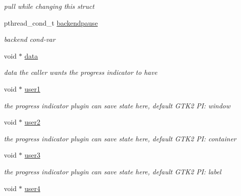 \begin{CompactItemize}
\begin{CompactList}\small\item\em pull while changing this struct \item\end{CompactList}\item 
\hypertarget{struct__noir__job_o24}{
pthread\_\-cond\_\-t \hyperlink{struct__noir__job_o24}{backendpause}}
\label{struct__noir__job_o24}

\begin{CompactList}\small\item\em backend cond-var \item\end{CompactList}\item 
\hypertarget{struct__noir__job_o25}{
void $\ast$ \hyperlink{struct__noir__job_o25}{data}}
\label{struct__noir__job_o25}

\begin{CompactList}\small\item\em data the caller wants the progress indicator to have \item\end{CompactList}\item 
\hypertarget{struct__noir__job_o26}{
void $\ast$ \hyperlink{struct__noir__job_o26}{user1}}
\label{struct__noir__job_o26}

\begin{CompactList}\small\item\em the progress indicator plugin can save state here, default GTK2 PI: window \item\end{CompactList}\item 
\hypertarget{struct__noir__job_o27}{
void $\ast$ \hyperlink{struct__noir__job_o27}{user2}}
\label{struct__noir__job_o27}

\begin{CompactList}\small\item\em the progress indicator plugin can save state here, default GTK2 PI: container \item\end{CompactList}\item 
\hypertarget{struct__noir__job_o28}{
void $\ast$ \hyperlink{struct__noir__job_o28}{user3}}
\label{struct__noir__job_o28}

\begin{CompactList}\small\item\em the progress indicator plugin can save state here, default GTK2 PI: label \item\end{CompactList}\item 
\hypertarget{struct__noir__job_o29}{
void $\ast$ \hyperlink{struct__noir__job_o29}{user4}}
\label{struct__noir__job_o29}


\end{CompactItemize}
